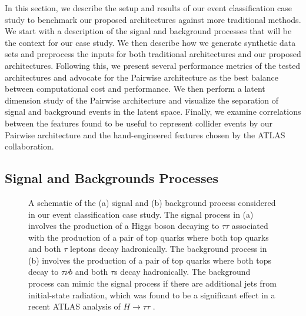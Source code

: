 \documentclass[aps,prd,twocolumn,superscriptaddress,floatfix,longbibliography,preprintnumbers,nofootinbib]{revtex4-1} %
\newif\ifptitle
\newif\ifpnumber
\newcounter{para}
\newcommand\ptitle[1]{\par\refstepcounter{para}
{\ifpnumber{\noindent\textcolor{lightgray}{\textbf{\thepara}}\indent}\fi}
{\ifptitle{\textbf{[{#1}]}}\fi}}
\begin{document}
In this section, we describe the setup and results of our event classification case study to benchmark our proposed architectures against more traditional methods.
%
We start with a description of the signal and background processes that will be the context for our case study.
%
We then describe how we generate synthetic data sets and preprocess the inputs for both traditional architectures and our proposed architectures.
%
Following this, we present several performance metrics of the tested architectures and advocate for the Pairwise architecture as the best balance between computational cost and performance.
%
We then perform a latent dimension study of the Pairwise architecture and visualize the separation of signal and background events in the latent space. 
%
Finally, we examine correlations between the features found to be useful to represent collider events by our Pairwise architecture and the hand-engineered features chosen by the ATLAS collaboration.


\subsection{Signal and Backgrounds Processes}
\label{sec:physical}

\begin{figure*}
  \hspace{6em}
  \caption{
  A schematic of the (a) signal and (b) background process considered in our event classification case study.
  The signal process in (a) involves the production of a Higgs boson decaying to \(\tau\tau\) associated with the production of a pair of top quarks where both top quarks and both \(\tau\) leptons decay hadronically.
  The background process in (b) involves the production of a pair of top quarks where both tops decay to \(\tau\nu b\) and both \(\tau\)s decay hadronically.
  The background process can mimic the signal process if there are additional jets from initial-state radiation, which was found to be a significant effect in a recent ATLAS analysis of \(H\rightarrow\tau\tau\) \cite{ATLAS:2022yrq}.
  }
  \label{fig:physical}
\end{figure*}

\ptitle{Description of event classification experiment + event generation}
\end{document}

